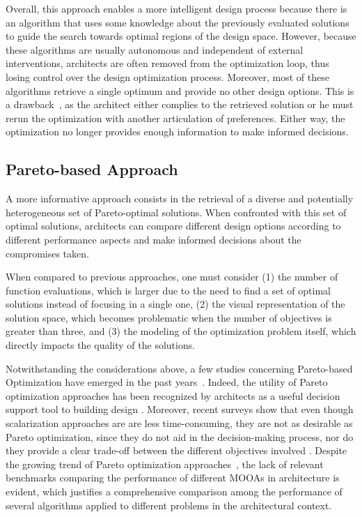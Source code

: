 	Overall, this approach enables a more intelligent design process because there is an algorithm that uses some knowledge about the previously evaluated solutions to guide the search towards optimal regions of the design space. However, because these algorithms are usually autonomous and independent of external
interventions, architects are often removed from the optimization loop, thus losing control over the design optimization process. Moreover, most of these algorithms
retrieve a single optimum and provide no other design options. This is a drawback~\cite{Cichocka2017SURVEY}, as the architect either complies to the retrieved solution or he must rerun the optimization with another articulation of preferences. Either
way, the optimization no longer provides enough information to make informed decisions.

\subsection{Pareto-based Approach}

	A more informative approach consists in the retrieval of a diverse and potentially heterogeneous set of Pareto-optimal solutions. When confronted with this set of optimal solutions, architects can compare different design options according to different performance aspects and make informed decisions about the compromises taken.

	When compared to previous approaches, one must consider (1) the number of function evaluations, which is larger due to the need to find a set of optimal solutions instead of focusing in a single one, (2) the visual representation of the solution space, which becomes problematic when the number of objectives is
greater than three, and (3) the modeling of the optimization problem itself, which directly impacts the quality of the solutions. 

	Notwithstanding the considerations above, a few studies concerning Pareto-based Optimization have emerged in the past years~\cite{Evins2013,Hamdy2016}. Indeed, the utility of Pareto optimization approaches has been recognized by architects as a useful decision support tool to building design \cite{Cichocka2017SURVEY}. Moreover, recent surveys show that even though scalarization approaches are are less time-consuming, they are not as desirable as Pareto optimization, since they do not aid in the decision-making process, nor
do they provide a clear trade-off between the different objectives involved \cite{Attia2013, Cichocka2017SURVEY}.
Despite the growing trend of Pareto optimization approaches~\cite{Evins2013}, the lack of relevant benchmarks comparing the performance of different \acp{MOOA} in architecture is evident, which justifies a comprehensive comparison among the performance of several algorithms applied to different problems in the
architectural context.

